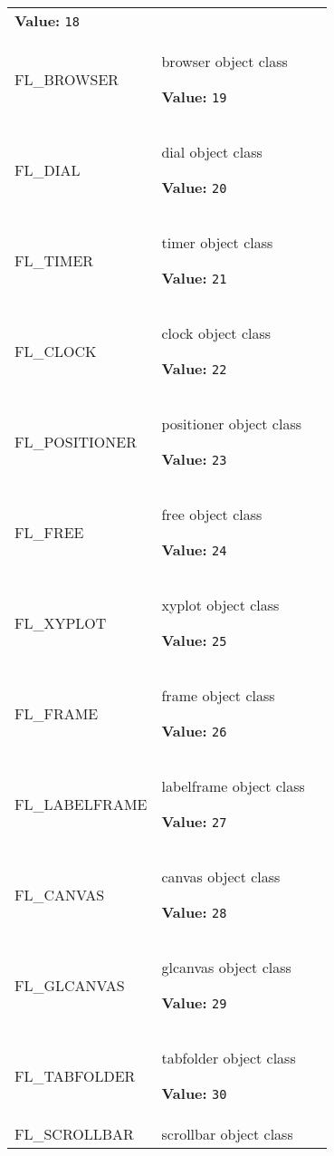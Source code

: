 \begin{longtable}{|p{\varnamewidth}|p{\vardescrwidth}|l}
\textbf{Value:} 
{\tt 18}&\\
\cline{1-2}
\raggedright F\-L\-\_\-B\-R\-O\-W\-S\-E\-R\- & \raggedright browser object class

\textbf{Value:} 
{\tt 19}&\\
\cline{1-2}
\raggedright F\-L\-\_\-D\-I\-A\-L\- & \raggedright dial object class

\textbf{Value:} 
{\tt 20}&\\
\cline{1-2}
\raggedright F\-L\-\_\-T\-I\-M\-E\-R\- & \raggedright timer object class

\textbf{Value:} 
{\tt 21}&\\
\cline{1-2}
\raggedright F\-L\-\_\-C\-L\-O\-C\-K\- & \raggedright clock object class

\textbf{Value:} 
{\tt 22}&\\
\cline{1-2}
\raggedright F\-L\-\_\-P\-O\-S\-I\-T\-I\-O\-N\-E\-R\- & \raggedright positioner object class

\textbf{Value:} 
{\tt 23}&\\
\cline{1-2}
\raggedright F\-L\-\_\-F\-R\-E\-E\- & \raggedright free object class

\textbf{Value:} 
{\tt 24}&\\
\cline{1-2}
\raggedright F\-L\-\_\-X\-Y\-P\-L\-O\-T\- & \raggedright xyplot object class

\textbf{Value:} 
{\tt 25}&\\
\cline{1-2}
\raggedright F\-L\-\_\-F\-R\-A\-M\-E\- & \raggedright frame object class

\textbf{Value:} 
{\tt 26}&\\
\cline{1-2}
\raggedright F\-L\-\_\-L\-A\-B\-E\-L\-F\-R\-A\-M\-E\- & \raggedright labelframe object class

\textbf{Value:} 
{\tt 27}&\\
\cline{1-2}
\raggedright F\-L\-\_\-C\-A\-N\-V\-A\-S\- & \raggedright canvas object class

\textbf{Value:} 
{\tt 28}&\\
\cline{1-2}
\raggedright F\-L\-\_\-G\-L\-C\-A\-N\-V\-A\-S\- & \raggedright glcanvas object class

\textbf{Value:} 
{\tt 29}&\\
\cline{1-2}
\raggedright F\-L\-\_\-T\-A\-B\-F\-O\-L\-D\-E\-R\- & \raggedright tabfolder object class

\textbf{Value:} 
{\tt 30}&\\
\cline{1-2}
\raggedright F\-L\-\_\-S\-C\-R\-O\-L\-L\-B\-A\-R\- & \raggedright scrollbar object class


\end{longtable}
